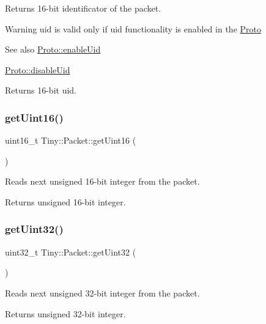 Returns 16-\/bit identificator of the packet. \begin{DoxyWarning}{Warning}
uid is valid only if uid functionality is enabled in the \hyperlink{classTiny_1_1Proto}{Proto} 
\end{DoxyWarning}
\begin{DoxySeeAlso}{See also}
\hyperlink{classTiny_1_1Proto_a9fdd64b8296e27f3205cd0d3ea685eac}{Proto\+::enable\+Uid} 

\hyperlink{classTiny_1_1Proto_aff9f3c59f58a8ca527ad0254ab806c5c}{Proto\+::disable\+Uid} 
\end{DoxySeeAlso}
\begin{DoxyReturn}{Returns}
16-\/bit uid. 
\end{DoxyReturn}
\mbox{\label{classTiny_1_1Packet_a71765e73adfbc67138f75c2b8ea7d74c}} 
\subsubsection{\texorpdfstring{get\+Uint16()}{getUint16()}}
{\footnotesize\ttfamily uint16\+\_\+t Tiny\+::\+Packet\+::get\+Uint16 (\begin{DoxyParamCaption}{ }\end{DoxyParamCaption})\hspace{0.3cm}{\ttfamily [inline]}}

Reads next unsigned 16-\/bit integer from the packet. \begin{DoxyReturn}{Returns}
unsigned 16-\/bit integer. 
\end{DoxyReturn}
\mbox{\label{classTiny_1_1Packet_a5dd4b89cb7224b62d4f0328c8e40f38f}} 
\subsubsection{\texorpdfstring{get\+Uint32()}{getUint32()}}
{\footnotesize\ttfamily uint32\+\_\+t Tiny\+::\+Packet\+::get\+Uint32 (\begin{DoxyParamCaption}{ }\end{DoxyParamCaption})\hspace{0.3cm}{\ttfamily [inline]}}

Reads next unsigned 32-\/bit integer from the packet. \begin{DoxyReturn}{Returns}
unsigned 32-\/bit integer. 
\end{DoxyReturn}
\mbox{\label{classTiny_1_1Packet_a9985ff3b48f81628a7428b1197ca9f8f}} 
